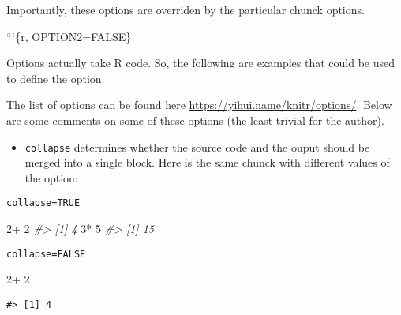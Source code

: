 \documentclass[]{book}
\newenvironment{Shaded}{}{}
\newcommand{\BaseNTok}[1]{\textcolor[rgb]{0.25,0.63,0.44}{#1}}
\newcommand{\CommentTok}[1]{\textcolor[rgb]{0.38,0.63,0.69}{\textit{#1}}}
\newcommand{\DecValTok}[1]{\textcolor[rgb]{0.25,0.63,0.44}{#1}}
\newcommand{\OperatorTok}[1]{\textcolor[rgb]{0.40,0.40,0.40}{#1}}
\newcommand{\StringTok}[1]{\textcolor[rgb]{0.25,0.44,0.63}{#1}}
\providecommand{\tightlist}{%
  \setlength{\itemsep}{0pt}\setlength{\parskip}{0pt}}
\theoremstyle{definition}
\theoremstyle{definition}
\theoremstyle{definition}
\theoremstyle{remark}
\begin{document}
Importantly, these options are overriden by the particular chunck
options.

\begin{Shaded}
\begin{Highlighting}[]
\BaseNTok{```\{r, OPTION2=FALSE\}}
\end{Highlighting}
\end{Shaded}

Options actually take R code. So, the following are examples that could
be used to define the option.

\begin{Shaded}
\end{Shaded}

The list of options can be found here
\url{https://yihui.name/knitr/options/}. Below are some comments on some
of these options (the least trivial for the author).

\begin{itemize}
\tightlist
\item
  \texttt{collapse} determines whether the source code and the ouput
  should be merged into a single block. Here is the same chunck with
  different values of the option:
\end{itemize}

\texttt{collapse=TRUE}

\begin{Shaded}
\begin{Highlighting}[]
\DecValTok{2}\OperatorTok{+}\StringTok{ }\DecValTok{2}
\CommentTok{#> [1] 4}
\DecValTok{3}\OperatorTok{*}\StringTok{ }\DecValTok{5}
\CommentTok{#> [1] 15}
\end{Highlighting}
\end{Shaded}

\texttt{collapse=FALSE}

\begin{Shaded}
\begin{Highlighting}[]
\DecValTok{2}\OperatorTok{+}\StringTok{ }\DecValTok{2}
\end{Highlighting}
\end{Shaded}

\begin{verbatim}
#> [1] 4
\end{verbatim}
\end{document}
